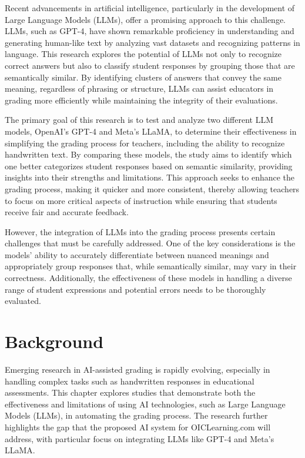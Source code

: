 \documentclass[ms,twoside,print]{nuthesis}
\begin{document}
Recent advancements in artificial intelligence, particularly in the development of Large Language Models (LLMs), 
offer a promising approach to this challenge. LLMs, such as GPT-4, have shown remarkable proficiency in understanding 
and generating human-like text by analyzing vast datasets and recognizing patterns in language. This research explores 
the potential of LLMs not only to recognize correct answers but also to classify student responses by grouping 
those that are semantically similar. By identifying clusters of answers that convey the same meaning, regardless 
of phrasing or structure, LLMs can assist educators in grading more efficiently while maintaining the integrity of 
their evaluations.

The primary goal of this research is to test and analyze two different LLM models, OpenAI's GPT-4 and Meta's LLaMA, 
to determine their effectiveness in simplifying the grading process for teachers, including the ability to recognize 
handwritten text. By comparing these models, the study aims to identify which one better categorizes student responses 
based on semantic similarity, providing insights into their strengths and limitations. This approach seeks to enhance 
the grading process, making it quicker and more consistent, thereby allowing teachers to focus on more critical aspects 
of instruction while ensuring that students receive fair and accurate feedback.

However, the integration of LLMs into the grading process presents certain challenges that must be carefully 
addressed. One of the key considerations is the models' ability to accurately differentiate between nuanced 
meanings and appropriately group responses that, while semantically similar, may vary in their correctness. 
Additionally, the effectiveness of these models in handling a diverse range of student expressions and 
potential errors needs to be thoroughly evaluated.

\chapter{Background}

Emerging research in AI-assisted grading is rapidly evolving, especially in handling complex tasks 
such as handwritten responses in educational assessments. This chapter explores studies that demonstrate 
both the effectiveness and limitations of using AI technologies, such as Large Language Models (LLMs), 
in automating the grading process. The research further highlights the gap that the proposed AI system 
for OICLearning.com will address, with particular focus on integrating LLMs like GPT-4 and Meta's LLaMA.
\end{document}
